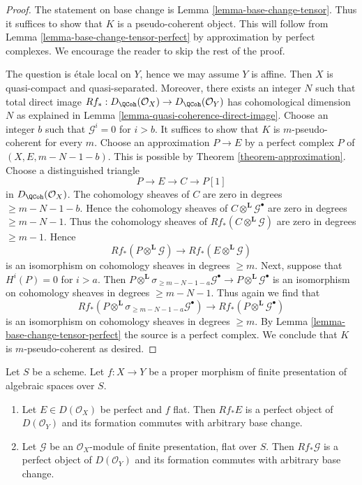 \begin{proof}
The statement on base change is Lemma \ref{lemma-base-change-tensor}.
Thus it suffices to show that $K$ is a pseudo-coherent object.
This will follow from Lemma \ref{lemma-base-change-tensor-perfect}
by approximation by perfect complexes. We encourage the reader to
skip the rest of the proof.

\medskip\noindent
The question is \'etale local on $Y$, hence we may assume $Y$ is affine.
Then $X$ is quasi-compact and quasi-separated. Moreover, there
exists an integer $N$ such that total direct image
$Rf_* : D_\QCoh(\mathcal{O}_X) \to D_\QCoh(\mathcal{O}_Y)$
has cohomological dimension $N$ as explained in
Lemma \ref{lemma-quasi-coherence-direct-image}.
Choose an integer $b$ such that $\mathcal{G}^i = 0$ for $i > b$.
It suffices to show that $K$ is $m$-pseudo-coherent for
every $m$. Choose an approximation $P \to E$ by a perfect complex $P$
of $(X, E, m - N - 1 - b)$. This is possible by
Theorem \ref{theorem-approximation}.
Choose a distinguished triangle
$$
P \to E \to C \to P[1]
$$
in $D_\QCoh(\mathcal{O}_X)$. The cohomology sheaves of $C$ are zero
in degrees $\geq m - N - 1 - b$. Hence
the cohomology sheaves of $C \otimes^\mathbf{L} \mathcal{G}^\bullet$
are zero in degrees $\geq m - N - 1$.
Thus the cohomology sheaves of $Rf_*(C \otimes^\mathbf{L} \mathcal{G})$
are zero in degrees $\geq m - 1$. Hence
$$
Rf_*(P \otimes^\mathbf{L} \mathcal{G}) \to
Rf_*(E \otimes^\mathbf{L} \mathcal{G})
$$
is an isomorphism on cohomology sheaves in degrees $\geq m$.
Next, suppose that $H^i(P) = 0$ for $i > a$. Then
$
P \otimes^\mathbf{L} \sigma_{\geq m - N - 1 - a}\mathcal{G}^\bullet
\longrightarrow
P \otimes^\mathbf{L} \mathcal{G}^\bullet
$
is an isomorphism on cohomology sheaves in degrees $\geq m - N - 1$.
Thus again we find that
$$
Rf_*(P \otimes^\mathbf{L} \sigma_{\geq m - N - 1 - a}\mathcal{G}^\bullet) \to
Rf_*(P \otimes^\mathbf{L} \mathcal{G}^\bullet)
$$
is an isomorphism on cohomology sheaves in degrees $\geq m$.
By Lemma \ref{lemma-base-change-tensor-perfect} the source
is a perfect complex.
We conclude that $K$ is $m$-pseudo-coherent as desired.
\end{proof}

\begin{lemma}
\label{lemma-flat-proper-perfect-direct-image-general}
Let $S$ be a scheme. Let $f : X \to Y$ be a proper
morphism of finite presentation of algebraic spaces over $S$.
\begin{enumerate}
\item Let $E \in D(\mathcal{O}_X)$ be perfect and $f$ flat. Then
$Rf_*E$ is a perfect object of $D(\mathcal{O}_Y)$ and its formation
commutes with arbitrary base change.
\item Let $\mathcal{G}$ be an $\mathcal{O}_X$-module of finite presentation,
flat over $S$. Then $Rf_*\mathcal{G}$ is a perfect object of
$D(\mathcal{O}_Y)$ and its formation commutes with arbitrary base change.
\end{enumerate}
\end{lemma}

